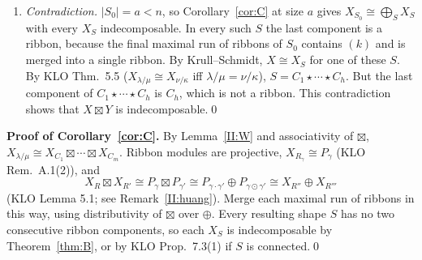 \documentclass[11pt]{amsart}
\newcommand{\End}{\operatorname{End}}
\newcommand{\sq}{\boxtimes}
\newcommand{\ok}{\mathrm{ok}}
\theoremstyle{plain}
\theoremstyle{definition}
\begin{document}
\begin{enumerate}[label=\textup{Step \arabic*.},leftmargin=3.6em,itemsep=3pt]
\begin{itemize}[itemsep=1pt]
\item $\End X$ is local, so the non-units form an ideal, and some $g_\nu$ is a unit. Then $\varepsilon_i\circ g_\nu\ne0$, so $\widehat\lambda=\varepsilon_i\circ\zeta$ is nonzero on $\widehat L_\nu$. Since $\widehat\lambda(T_\ell\otimes x\otimes1)=[\ell\ \ok]\varepsilon_i(x)$, this gives an SYT $T\in Q_\nu$ with $\varepsilon_i(T)\ne0$.
\item By Lemma~\ref{II:support}(ii), this forces $\nu=\nu_0$, the shape of $X$ minus the last $k$ cells of the bottom row. This is a valid order ideal because $k\le\ell_{\mathrm{last}}$, and $f^{\mathrm{sh}(X)/\nu_0}=1$.
\item Hence $X$ is a direct summand of $\widehat L_{\nu_0}\cong X_{\nu_0}\sq X_{(k)}\cong X_{S_0}$, where
\[
S_0:=C_1\star\cdots\star C_{h-1}\star C_h^-\star(k).
\]
This uses Lemma~\ref{II:W} and $C_{[k-1]}=X_{(k)}$, the one-row module. (Empty columns created by deleting cells may be compressed away; the module depends only on the relative row and column order of the cells.) $C_h^-$ may itself split as $C_h'\star(\text{row segment})$.
\end{itemize}
\item \emph{Contradiction.} $|S_0|=a<n$, so Corollary~\ref{cor:C} at size $a$ gives $X_{S_0}\cong\bigoplus_SX_S$ with every $X_S$ indecomposable. In every such $S$ the last component is a ribbon, because the final maximal run of ribbons of $S_0$ contains $(k)$ and is merged into a single ribbon. By Krull--Schmidt, $X\cong X_S$ for one of these $S$. By KLO Thm.~5.5 ($X_{\lambda/\mu}\cong X_{\nu/\kappa}$ iff $\lambda/\mu=\nu/\kappa$), $S=C_1\star\cdots\star C_h$. But the last component of $C_1\star\cdots\star C_h$ is $C_h$, which is not a ribbon. This contradiction shows that $X\sq Y$ is indecomposable.\qed
\end{enumerate}

\noindent\textbf{Proof of Corollary~\ref{cor:C}.} By Lemma~\ref{II:W} and associativity of $\sq$, $X_{\lambda/\mu}\cong X_{C_1}\sq\cdots\sq X_{C_m}$. Ribbon modules are projective, $X_{R_\gamma}\cong P_\gamma$ (KLO Rem.~A.1(2)), and
\[
X_R\sq X_{R'}\cong P_\gamma\sq P_{\gamma'}\cong P_{\gamma\cdot\gamma'}\oplus P_{\gamma\odot\gamma'}\cong X_{R''}\oplus X_{R'''}
\]
(KLO Lemma 5.1; see Remark~\ref{II:huang}). Merge each maximal run of ribbons in this way, using distributivity of $\sq$ over $\oplus$. Every resulting shape $S$ has no two consecutive ribbon components, so each $X_S$ is indecomposable by Theorem~\ref{thm:B}, or by KLO Prop.~7.3(1) if $S$ is connected.\qed
\end{document}
